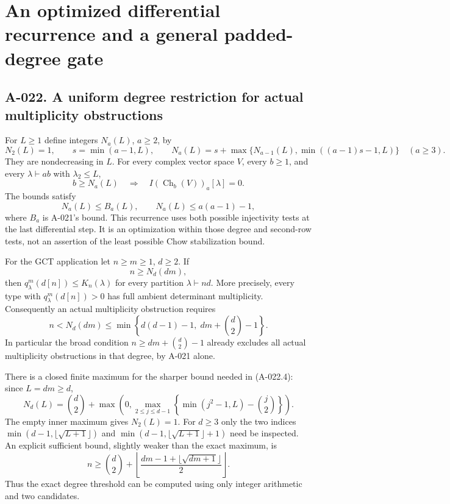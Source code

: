 \section{An optimized differential recurrence and a general padded-degree gate}

\subsection*{A-022. A uniform degree restriction for actual multiplicity obstructions}
For $L\geq1$ define integers $N_a(L)$, $a\geq2$, by
\[
 N_2(L)=1,\qquad s=\min(a-1,L),\qquad
 N_a(L)=s+\max\{N_{a-1}(L),\min((a-1)s-1,L)\}
                       \quad(a\geq3).                 \tag{A-022.1}
\]
They are nondecreasing in $L$. For every complex vector space
$V$, every $b\geq1$, and every $\lambda\vdash ab$ with
$\lambda_2\leq L$,
\[
 b\geq N_a(L)
 \quad\Longrightarrow\quad
 I(\operatorname{Ch}_b(V))_a[\lambda]=0.                \tag{A-022.2}
\]
The bounds satisfy
\[
 N_a(L)\leq B_a(L),\qquad
 N_a(L)\leq a(a-1)-1,                                 \tag{A-022.3}
\]
where $B_a$ is A-021's bound. This recurrence uses both
possible injectivity tests at the last differential step. It
is an optimization within those degree and second-row tests,
not an assertion of the least possible Chow stabilization bound.

For the GCT application let $n\geq m\geq1$, $d\geq2$.
If
\[
                              n\geq N_d(dm),           \tag{A-022.4}
\]
then $q^m_\lambda(d[n])\leq K_n(\lambda)$ for every partition
$\lambda\vdash nd$. More precisely, every type with
$q^m_\lambda(d[n])>0$ has full ambient determinant multiplicity.
Consequently an actual multiplicity obstruction requires
\[
 n<N_d(dm)\leq
 \min\left\{d(d-1)-1,\;dm+\binom d2-1\right\}.        \tag{A-022.5}
\]
In particular the broad condition
$n\geq dm+\binom d2-1$ already excludes all actual
multiplicity obstructions in that degree, by A-021 alone.

There is a closed finite maximum for the sharper bound needed
in (A-022.4): since $L=dm\geq d$,
\[
 \boxed{\quad N_d(L)=\binom d2+
 \max\left(0,\max_{2\leq j\leq d-1}
      \left\{\min(j^2-1,L)-\binom j2\right\}\right).\quad}
                                                               \tag{A-022.6}
\]
The empty inner maximum gives $N_2(L)=1$. For $d\geq3$
only the two indices
$\min(d-1,\lfloor\sqrt{L+1}\rfloor)$ and
$\min(d-1,\lfloor\sqrt{L+1}\rfloor+1)$ need be inspected.
An explicit sufficient bound, slightly weaker than the exact
maximum, is
\[
 n\geq \binom d2+
 \left\lfloor\frac{dm-1+\lfloor\sqrt{dm+1}\rfloor}{2}
                                                    \right\rfloor.
                                                               \tag{A-022.7}
\]
Thus the exact degree threshold can be computed using only
integer arithmetic and two candidates.

